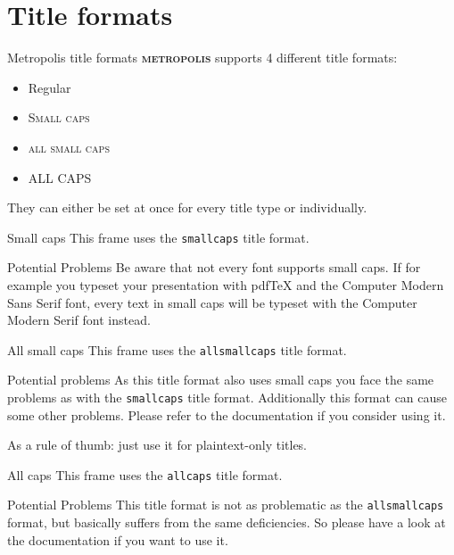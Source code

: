 \documentclass[10pt]{beamer}
\newcommand{\themename}{\textbf{\textsc{metropolis}}\xspace}
\begin{document}
\section{Title formats}

\begin{frame}{Metropolis title formats}
    \themename supports 4 different title formats:
    \begin{itemize}
        \item Regular
        \item \textsc{Small caps}
        \item \textsc{all small caps}
        \item ALL CAPS
    \end{itemize}
    They can either be set at once for every title type or individually.
\end{frame}

{
\begin{frame}{Small caps}
    This frame uses the \texttt{smallcaps} title format.

    \begin{alertblock}{Potential Problems}
        Be aware that not every font supports small caps. If for example you typeset your presentation with pdfTeX and the Computer Modern Sans Serif font, every text in small caps will be typeset with the Computer Modern Serif font instead.
    \end{alertblock}
\end{frame}
}

{
\begin{frame}{All small caps}
    This frame uses the \texttt{allsmallcaps} title format.

    \begin{alertblock}{Potential problems}
        As this title format also uses small caps you face the same problems as with the \texttt{smallcaps} title format. Additionally this format can cause some other problems. Please refer to the documentation if you consider using it.

        As a rule of thumb: just use it for plaintext-only titles.
    \end{alertblock}
\end{frame}
}

{
\begin{frame}{All caps}
    This frame uses the \texttt{allcaps} title format.

    \begin{alertblock}{Potential Problems}
        This title format is not as problematic as the \texttt{allsmallcaps} format, but basically suffers from the same deficiencies. So please have a look at the documentation if you want to use it.
    \end{alertblock}
\end{frame}
}
\end{document}
